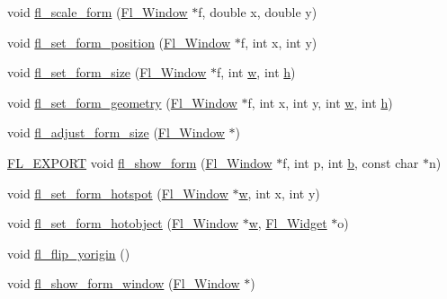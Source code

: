 \begin{DoxyCompactItemize}
\item 
void \hyperlink{forms_8_h_a7c47acf58203ebaea0ece61ff0f516ab}{fl\+\_\+scale\+\_\+form} (\hyperlink{class_fl___window}{Fl\+\_\+\+Window} $\ast$f, double x, double y)
\item 
void \hyperlink{forms_8_h_ad19cb000c04e4e2029a4f636501e7bf2}{fl\+\_\+set\+\_\+form\+\_\+position} (\hyperlink{class_fl___window}{Fl\+\_\+\+Window} $\ast$f, int x, int y)
\item 
void \hyperlink{forms_8_h_a4d8922c99c042943dc14543435b9e961}{fl\+\_\+set\+\_\+form\+\_\+size} (\hyperlink{class_fl___window}{Fl\+\_\+\+Window} $\ast$f, int \hyperlink{forms_8_h_aac374e320caaadeca4874add33b62af2}{w}, int \hyperlink{forms_8_h_a7e427ba5b307f9068129699250690066}{h})
\item 
void \hyperlink{forms_8_h_a5498d795dcac917c76f803b45338fb0a}{fl\+\_\+set\+\_\+form\+\_\+geometry} (\hyperlink{class_fl___window}{Fl\+\_\+\+Window} $\ast$f, int x, int y, int \hyperlink{forms_8_h_aac374e320caaadeca4874add33b62af2}{w}, int \hyperlink{forms_8_h_a7e427ba5b307f9068129699250690066}{h})
\item 
void \hyperlink{forms_8_h_a805ab2a14638f1c99169e48763c0e896}{fl\+\_\+adjust\+\_\+form\+\_\+size} (\hyperlink{class_fl___window}{Fl\+\_\+\+Window} $\ast$)
\item 
\hyperlink{_fl___export_8_h_aa9ba29a18aee9d738370a06eeb4470fc}{F\+L\+\_\+\+E\+X\+P\+O\+RT} void \hyperlink{forms_8_h_a35d34745363601aaf84379175e7b3702}{fl\+\_\+show\+\_\+form} (\hyperlink{class_fl___window}{Fl\+\_\+\+Window} $\ast$f, int p, int \hyperlink{forms_8_h_a0ba06a290a384fa06b1b90745827dae2}{b}, const char $\ast$n)
\item 
void \hyperlink{forms_8_h_aefad09b89f71894a9c511a6b4a36b578}{fl\+\_\+set\+\_\+form\+\_\+hotspot} (\hyperlink{class_fl___window}{Fl\+\_\+\+Window} $\ast$\hyperlink{forms_8_h_aac374e320caaadeca4874add33b62af2}{w}, int x, int y)
\item 
void \hyperlink{forms_8_h_a9d3317126bebccbf9797a4c03fe2c38e}{fl\+\_\+set\+\_\+form\+\_\+hotobject} (\hyperlink{class_fl___window}{Fl\+\_\+\+Window} $\ast$\hyperlink{forms_8_h_aac374e320caaadeca4874add33b62af2}{w}, \hyperlink{class_fl___widget}{Fl\+\_\+\+Widget} $\ast$o)
\item 
void \hyperlink{forms_8_h_a134231aafb176b95fbc36d161a1a3f3c}{fl\+\_\+flip\+\_\+yorigin} ()
\item 
void \hyperlink{forms_8_h_a450b0f8c922b358f41f8bdee7c76cf3a}{fl\+\_\+show\+\_\+form\+\_\+window} (\hyperlink{class_fl___window}{Fl\+\_\+\+Window} $\ast$)

\end{DoxyCompactItemize}
